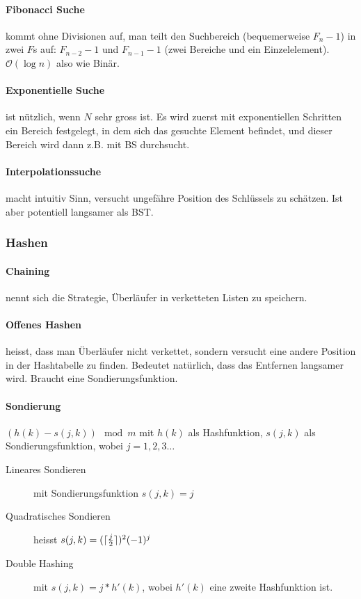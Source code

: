 \documentclass[a4paper, 9pt, DIV=20]{scrartcl}
\DeclarePairedDelimiter{\ceil}{\lceil}{\rceil}
\newcommand{\Oh}{\mathcal{O}}
\begin{document}
\paragraph{Fibonacci Suche} kommt ohne Divisionen auf, man teilt den Suchbereich (bequemerweise $F_{n}-1$) in zwei $F$s auf: $F_{n-2}-1$ und $F_{n-1}-1$ (zwei Bereiche und ein Einzelelement). $\Oh{(\log{n})}$ also wie Binär.

\paragraph{Exponentielle Suche} ist nützlich, wenn $N$ sehr gross ist. Es wird zuerst mit exponentiellen Schritten ein Bereich festgelegt, in dem sich das gesuchte Element befindet, und dieser Bereich wird dann z.B. mit BS durchsucht.

\paragraph{Interpolationssuche} macht intuitiv Sinn, versucht ungefähre Position des Schlüssels zu schätzen. Ist aber potentiell langsamer als BST.

\subsubsection{Hashen}
\paragraph{Chaining} nennt sich die Strategie, Überläufer in verketteten Listen zu speichern.

\paragraph{Offenes Hashen} heisst, dass man Überläufer nicht verkettet, sondern versucht eine andere Position in der Hashtabelle zu finden. Bedeutet natürlich, dass das Entfernen langsamer wird. Braucht eine Sondierungsfunktion.

\paragraph{Sondierung} $(h(k)-s(j,k))\mod{m}$ mit $h(k)$ als Hashfunktion, $s(j,k)$ als Sondierungsfunktion, wobei $j=1,2,3\dots$

\begin{description}
\item[Lineares Sondieren] mit Sondierungsfunktion $s(j,k)=j$
\item[Quadratisches Sondieren] heisst $s(j,k)=(\ceil{\frac{j}{2}})^{2}(-1)^{j}$
\item[Double Hashing] mit $s(j,k)=j*h'(k)$, wobei $h'(k)$ eine zweite Hashfunktion ist.
\end{description}
\end{document}
